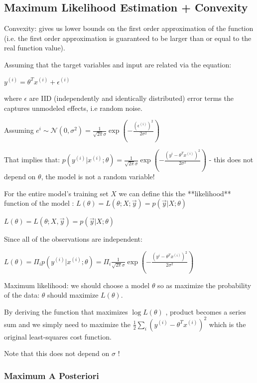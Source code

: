 \subsection{ Maximum Likelihood Estimation + Convexity}

Convexity: gives us lower bounds on the first order approximation of the function (i.e. the first order approximation is guaranteed to be larger than or equal to the real function value).

Assuming that the target variables and input are related via the equation: 

$y^{(i)}=\theta^Tx^{(i)}+\epsilon^{(i)}$

where $\epsilon$ are IID (independently and identically distributed) error terms the captures unmodeled effects, i.e random noise.

Assuming $e^{i}\sim\mathcal{N}(0,\sigma^2)=\frac{1}{\sqrt{2\pi}\sigma}\exp\left(-\frac{(\epsilon^{(i)})^2}{2\sigma^2}\right)$

That implies that: $p(y^{(i)}|x^{(i)};\theta)=\frac{1}{\sqrt{2\pi}\sigma}\exp\left(-\frac{(y^{i}- \theta^Tx^{(i)})^2}{2\sigma^2}\right)$ - this does not depend on $\theta$, the model is not a random variable! 

For the entire model's training set $X$  we can define this the **likelihood** function of the model : $L(\theta)=L(\theta;X;\vec{y})=p(\vec{y}|X;\theta)$

$L(\theta) = L(\theta;X,\vec y) = p(\vec y| X;\theta)$

Since all of the observations are independent:

$L(\theta)= \Pi_{i} p(y^{(i)}| x^{(i)};\theta) = \Pi_{i} \frac{1}{\sqrt{2\pi}\sigma}\exp\left(-\frac{(y^{i}- \theta^Tx^{(i)})^2}{2\sigma^2}\right) $

Maximum likelihood: we should choose a model $\theta$ so as maximize the probability of the data: $\theta$ should maximize $L(\theta)$. 

By deriving the function that maximizes $\log L(\theta)$ , product becomes a series sum and we simply need to maximize the $\frac 1 2 \sum_i (y^{(i)}-\theta^T x^{(i)})^2$ which is the original least-squares cost function.

Note that this does not depend on $\sigma$ !

\subsubsection{Maximum A Posteriori}

